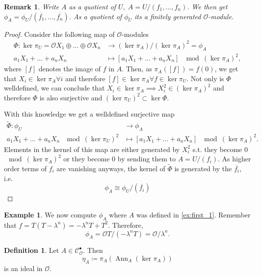 \documentclass{article}
\theoremstyle{plain}%
\newtheorem{remark}{Remark}[section]
\theoremstyle{definition}
\newtheorem{definition}{Definition}[section]
\newtheorem{example}{Example}[section]
\theoremstyle{remark}
\newcommand{\cob}{\mathcal{C}_\mathcal{O}^\bullet}
\newcommand{\ann}{\operatorname{Ann}}
\begin{document}
\begin{remark}
    Write \(A\) as a quotient of \(U,\; A = U/(f_1, \dots, f_n)\).
    We then get \(\phi_A = \phi_U/(\overline{f_1}, \dots, \overline{f_n})\).
    As a quotient of \(\phi_U\) its a finitely generated \(\mathcal{O}\)-module.
\end{remark}
\begin{proof}
    Consider the following map of \(\mathcal{O}\)-modules
    \begin{align*}
        \Phi\colon \ker \pi_U = \mathcal{O}X_1 \oplus \dots \oplus \mathcal{O}X_n &\to (\ker \pi_A)/(\ker \pi_A)^2 = \phi_A\\
        a_1X_1 + \dots + a_nX_n &\mapsto [a_1X_1 + \dots + a_nX_n] \; \mod (\ker \pi_A)^2,
    \end{align*}
    where \([f]\) denotes the image of \(f\) in \(A\).
    Then, as \(\pi_A([f]) = f(0)\), we get that \(X_i \in \ker \pi_A \forall i\)
    and therefore \([f] \in \ker \pi_A \forall f \in \ker \pi_U\). Not only is \(\Phi\) welldefined,
    we can conclude that \(X_i \in \ker \pi_A \implies X_i^2 \in (\ker \pi_A)^2\)
    and therefore \(\Phi\) is also surjective and \((\ker \pi_U)^2 \subset \ker \Phi\).
    
    With this knowledge we get a welldefined surjective map
    \begin{align*}
        \tilde \Phi\colon \phi_U &\to \phi_A\\
        a_1X_1 + \dots + a_nX_n \; \mod (\ker \pi_U)^2 &\mapsto [a_1X_1 + \dots + a_nX_n] \; \mod (\ker \pi_A)^2.
    \end{align*}
    Elements in the kernel of this map are either generated by \(X_i^2\) s.t. they become 0 \(\mod (\ker \pi_A)^2\)
    or they become 0 by sending them to \(A = U/(f_i)\).
    As higher order terms of \(f_i\) are vanishing anyways, 
    the kernel of \(\tilde \Phi\) is generated by the \(\overline{f_i}\), i.e.
    \[
        \phi_A \cong \phi_U/(\overline{f_i})  
    \]
\end{proof}

\begin{example}\label{ex:first_phi}
    We now compute \(\phi_A\) where \(A\) was defined in \cref{ex:first_1}.
    Remember that \(f = T(T-\lambda^n) = -\lambda^n T + T^2\). Therefore,
    \[\phi_A = \mathcal{O}T/(-\lambda^n T) = \mathcal{O}/\lambda^n.\]
\end{example}

\begin{definition}
    Let \(A \in \cob\). Then
    \[\eta_A \coloneqq \pi_A(\ann_A (\ker \pi_A))\] is an ideal in \(\mathcal{O}\).
\end{definition}
\end{document}
